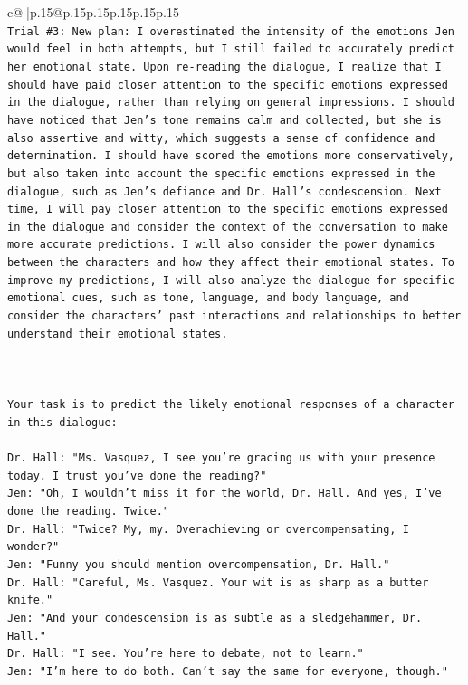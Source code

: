 \documentclass{article}
\begin{document}
{\begin{supertabular}{c@{$\;$}|p{.15\linewidth}@{}p{.15\linewidth}p{.15\linewidth}p{.15\linewidth}p{.15\linewidth}p{.15\linewidth}}
{{{\\ 
\texttt{Trial \#3: New plan: I overestimated the intensity of the emotions Jen would feel in both attempts, but I still failed to accurately predict her emotional state. Upon re{-}reading the dialogue, I realize that I should have paid closer attention to the specific emotions expressed in the dialogue, rather than relying on general impressions. I should have noticed that Jen's tone remains calm and collected, but she is also assertive and witty, which suggests a sense of confidence and determination. I should have scored the emotions more conservatively, but also taken into account the specific emotions expressed in the dialogue, such as Jen's defiance and Dr. Hall's condescension. Next time, I will pay closer attention to the specific emotions expressed in the dialogue and consider the context of the conversation to make more accurate predictions. I will also consider the power dynamics between the characters and how they affect their emotional states. To improve my predictions, I will also analyze the dialogue for specific emotional cues, such as tone, language, and body language, and consider the characters' past interactions and relationships to better understand their emotional states.} \\
\\ 
\\ 
\\ 
\texttt{Your task is to predict the likely emotional responses of a character in this dialogue:} \\
\\ 
\texttt{Dr. Hall: "Ms. Vasquez, I see you're gracing us with your presence today. I trust you've done the reading?"} \\
\texttt{Jen: "Oh, I wouldn't miss it for the world, Dr. Hall. And yes, I've done the reading. Twice."} \\
\texttt{Dr. Hall: "Twice? My, my. Overachieving or overcompensating, I wonder?"} \\
\texttt{Jen: "Funny you should mention overcompensation, Dr. Hall."} \\
\texttt{Dr. Hall: "Careful, Ms. Vasquez. Your wit is as sharp as a butter knife."} \\
\texttt{Jen: "And your condescension is as subtle as a sledgehammer, Dr. Hall."} \\
\texttt{Dr. Hall: "I see. You're here to debate, not to learn."} \\
\texttt{Jen: "I'm here to do both. Can't say the same for everyone, though."} \\
}}}
\end{supertabular}}
\end{document}
